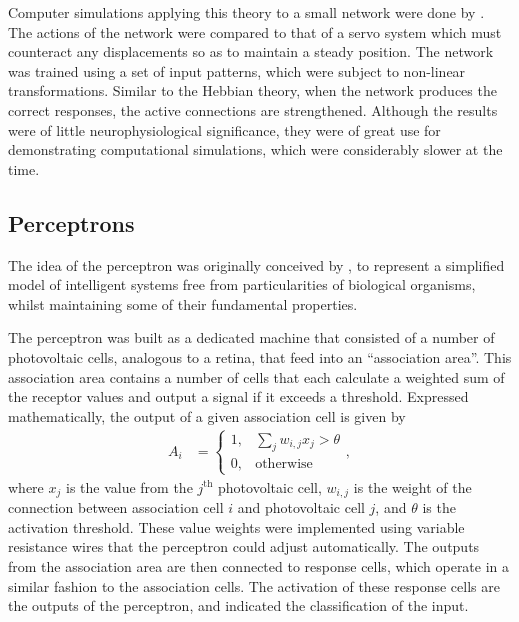 Computer simulations applying this theory to a small network were done by
\cite{Farley:1954:Simulation}.
The actions of the network were compared to that of a servo system which must
counteract any displacements so as to maintain a steady position.
The network was trained using a set of input patterns, which were subject to
non-linear transformations.
Similar to the Hebbian theory, when the network produces the correct responses,
the active connections are strengthened.
Although the results were of little neurophysiological significance, they were
of great use for demonstrating computational simulations, which were
considerably slower at the time.



\subsection{Perceptrons}

The idea of the perceptron was originally conceived by
\cite{Rosenblatt:1958:Perceptron}, to represent a simplified model of
intelligent systems free from particularities of biological organisms, whilst
maintaining some of their fundamental properties.

The perceptron was built as a dedicated machine that consisted of a number of
photovoltaic cells, analogous to a retina, that feed into an ``association
area''.
This association area contains a number of cells that each calculate a weighted
sum of the receptor values and output a signal if it exceeds a threshold.
Expressed mathematically, the output of a given association cell is given by
\begin{align*}
    A_i &= \begin{cases}
        1, & \sum_j w_{i,j}x_j > \theta\\
        0, & \text{otherwise}
    \end{cases},
\end{align*}
where $x_j$ is the value from the $j^\text{th}$ photovoltaic cell, $w_{i,j}$
is the weight of the connection between association cell $i$ and photovoltaic
cell $j$, and $\theta$ is the activation threshold.
These value weights were implemented using variable resistance wires that the
perceptron could adjust automatically.
The outputs from the association area are then connected to response cells,
which operate in a similar fashion to the association cells.
The activation of these response cells are the outputs of the perceptron, and
indicated the classification of the input.

